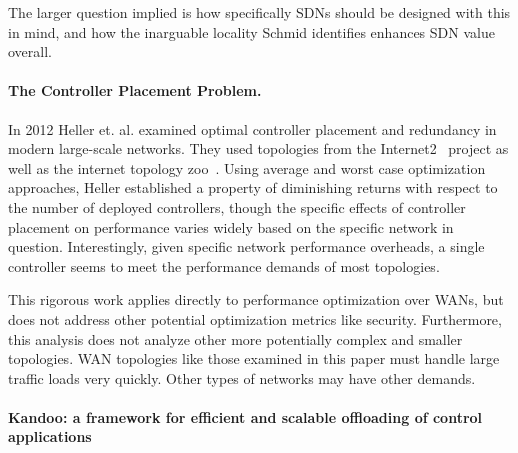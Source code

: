 \documentclass[10pt,letterpaper]{article}
\begin{document}
The larger question implied is how specifically SDNs should be designed with this in mind, and how the inarguable locality Schmid identifies enhances SDN value overall.

\paragraph{The Controller Placement Problem.}
In 2012 Heller et. al. examined optimal controller placement and redundancy in modern large-scale networks. They used topologies from the Internet2~\cite{internet2} project as well as the internet topology zoo~\cite{internet-topo-zoo}. Using average and worst case optimization approaches, Heller established a property of diminishing returns with respect to the number of deployed controllers, though the specific effects of controller placement on performance varies widely based on the specific network in question.  Interestingly, given specific network performance overheads, a single controller seems to meet the performance demands of most topologies\cite{HeShMc:12}. 

This rigorous work applies directly to performance optimization over WANs, but does not address other potential optimization metrics like security.  Furthermore, this analysis does not analyze other more potentially complex and smaller topologies.  WAN topologies like those examined in this paper must handle large traffic loads very quickly.  Other types of networks may have other demands.

\paragraph{Kandoo: a framework for efficient and scalable offloading of control applications}

\cite{HaGa:12}



\end{document}
